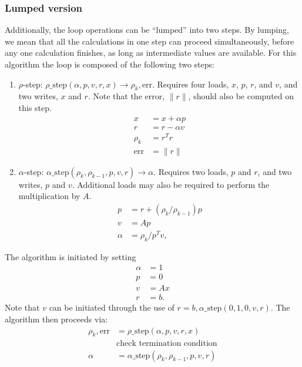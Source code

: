 \documentclass{article}
\begin{document}
\subsubsection{Lumped version}
Additionally, the loop operations can be ``lumped'' into two steps.
By lumping, we mean that all the calculations in one step can proceed
    simultaneously, before any one calculation finishes,
    as long as intermediate values are available.
For this algorithm the loop is composed of the following two steps:
\begin{enumerate}
\item $\rho$-step: $\rho\_\text{step}(\alpha, p, v, r, x) 
                    \rightarrow \rho_k, \text{err} $.
    Requires four loads, $x$, $p$, $r$, and $v$, and two writes, $x$ and $r$.
    Note that the error, $\|r\|$, should also be computed on this step.
    \begin{subequations}\begin{align}
    x &= x + \alpha p \\
    r &= r - \alpha v \\
    \rho_k &= r^T r \\
    \text{err} &= \|r\| 
    \end{align}\end{subequations}
\item $\alpha$-step: $\alpha\_\text{step}(\rho_k, \rho_{k-1}, p, v, r) 
                        \rightarrow \alpha$.
    Requires two loads, $p$ and $r$, and two writes, $p$ and $v$. 
    Additional loads may also be required to perform the multiplication by $A$.
    \begin{subequations}\begin{align}
    p &= r + (\rho_k / \rho_{k-1}) p \\
    v &= A p \\
    \alpha &= \rho_k / p^T v,
    \end{align}\end{subequations}
\end{enumerate}

The algorithm is initiated by setting
    \begin{subequations}\begin{align}
    \alpha &= 1 \\
    p &= 0 \\
    v &= Ax \\
    r &= b.
    \end{align}\end{subequations}
Note that $v$ can be initiated through the use of 
    $r =b, \alpha\_\text{step}(0, 1, 0, v, r)$.
The algorithm then proceeds via:
    \begin{subequations}\begin{align}
    \rho_k, \text{err} &= \rho\_\text{step}(\alpha, p, v, r, x) \\
    & \text{check termination condition} \\
    \alpha &= \alpha\_\text{step}(\rho_k, \rho_{k-1}, p, v, r) 
    \end{align}\end{subequations}
\end{document}
